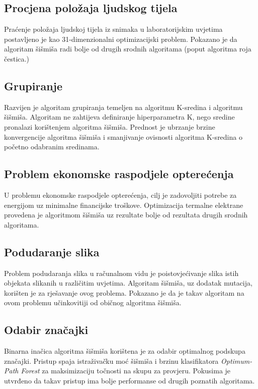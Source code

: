 \subsection{Procjena položaja ljudskog tijela}
\hspace{\parindent} Praćenje položaja ljudskoj tijela iz snimaka u laboratorijskim uvjetima postavljeno je kao 31-dimenzionalni optimizacijski problem.\cite{akhtar2012} Pokazano je da algoritam šišmiša radi bolje od drugih srodnih algoritama (poput algoritma roja čestica.)



\subsection{Grupiranje}
\hspace{\parindent} Razvijen je algoritam grupiranja temeljen na algoritmu K-sredina i algoritmu šišmiša.\cite{komarasamy2012} Algoritam ne zahtijeva definiranje hiperparametra K, nego sredine pronalazi korištenjem algoritma šišmiša. Prednost je ubrzanje brzine konvergencije algoritma šišmiša i smanjivanje ovisnosti algoritma K-sredina o početno odabranim sredinama.

\subsection{Problem ekonomske raspodjele opterećenja}
\hspace{\parindent} U problemu ekonomske raspodjele opterećenja, cilj je zadovoljiti potrebe za energijom uz minimalne financijske troškove. Optimizacija termalne elektrane provedena je algoritmom šišmiša uz rezultate bolje od rezultata drugih srodnih algoritama.\cite{biswal2013}

\subsection{Podudaranje slika}
\hspace{\parindent} Problem podudaranja slika u računalnom vidu je poistovjećivanje slika istih objekata slikanih u različitim uvjetima.\cite{zhangjia2012} Algoritam šišmiša, uz dodatak mutacija, korišten je za rješavanje ovog problema. Pokazano je da je takav algoritam na ovom problemu učinkovitiji od običnog algoritma šišmiša.

\subsection{Odabir značajki}
\hspace{\parindent} Binarna inačica algoritma šišmiša korištena je za odabir optimalnog podskupa značajki.\cite{6382769} Pristup spaja istraživačku moć šišmiša i brzinu klasifikatora \textit{Optimum-Path Forest} za maksimizaciju točnosti na skupu za provjeru. Pokusima je utvrđeno da takav pristup ima bolje performanse od drugih poznatih algoritama.

